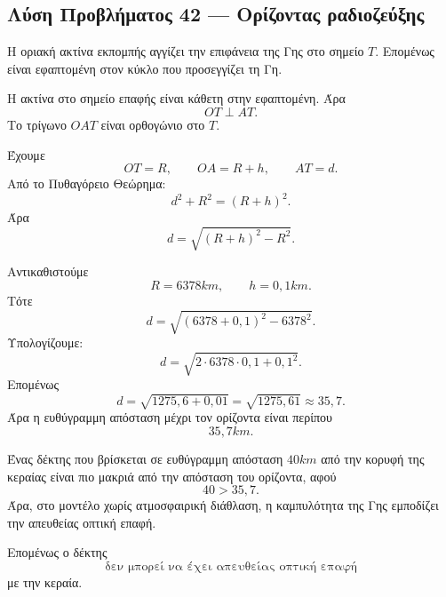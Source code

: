 \subsection*{Λύση Προβλήματος 42 --- Ορίζοντας ραδιοζεύξης}

\begin{alist}
  \item Η οριακή ακτίνα εκπομπής αγγίζει την επιφάνεια της Γης στο
        σημείο $T$. Επομένως είναι εφαπτομένη στον κύκλο που
        προσεγγίζει τη Γη.

        Η ακτίνα στο σημείο επαφής είναι κάθετη στην εφαπτομένη. Άρα
        \[
          OT\perp AT.
        \]
        Το τρίγωνο $OAT$ είναι ορθογώνιο στο $T$.

        Έχουμε
        \[
          OT=R,
          \qquad
          OA=R+h,
          \qquad
          AT=d.
        \]
        Από το Πυθαγόρειο Θεώρημα:
        \[
          d^2+R^2=(R+h)^2.
        \]
        Άρα
        \[
          {d=\sqrt{(R+h)^2-R^2}}.
        \]

  \item Αντικαθιστούμε
        \[
          R=6378\si{km},
          \qquad
          h=0{,}1\si{km}.
        \]
        Τότε
        \[
          d=\sqrt{(6378+0{,}1)^2-6378^2}.
        \]
        Υπολογίζουμε:
        \[
          d=\sqrt{2\cdot6378\cdot0{,}1+0{,}1^2}.
        \]
        Επομένως
        \[
          d=\sqrt{1275{,}6+0{,}01}
          =
          \sqrt{1275{,}61}
          \approx35{,}7.
        \]
        Άρα η ευθύγραμμη απόσταση μέχρι τον ορίζοντα είναι περίπου
        \[
          {35{,}7\si{km}}.
        \]

  \item Ένας δέκτης που βρίσκεται σε ευθύγραμμη απόσταση
        $40\si{km}$ από την κορυφή της κεραίας είναι πιο μακριά από την
        απόσταση του ορίζοντα, αφού
        \[
          40>35{,}7.
        \]
        Άρα, στο μοντέλο χωρίς ατμοσφαιρική διάθλαση, η καμπυλότητα της
        Γης εμποδίζει την απευθείας οπτική επαφή.

        Επομένως ο δέκτης
        \[
          {\text{δεν μπορεί να έχει απευθείας οπτική επαφή}}
        \]
        με την κεραία.
\end{alist}
